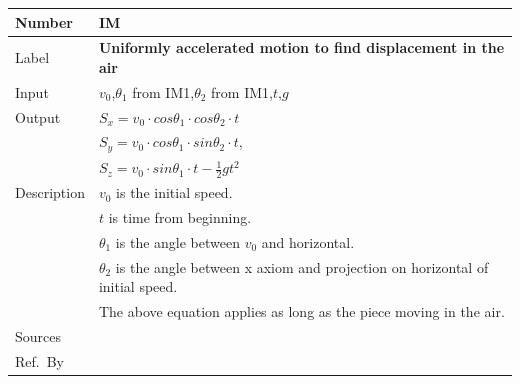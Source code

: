 \documentclass[12pt]{article}
\newcommand{\colAwidth}{0.13\textwidth}
\newcommand{\colBwidth}{0.82\textwidth}
\newcounter{instnum} %
\begin{document}
	\noindent
	\begin{minipage}{\textwidth}
		\renewcommand*{\arraystretch}{1.5}
		\begin{tabular}{| p{\colAwidth} | p{\colBwidth}|}
			\hline
			\rowcolor[gray]{0.9}
			Number& IM{instnum}\theinstnum \label{IM_DIA}\\
			\hline
			Label& \bf Uniformly accelerated motion to find displacement in the air\\
			\hline
			Input&$v_{0}$,$\theta_{1}$ from IM1,$\theta_{2}$ from IM1,$t$,$g$\\
			\hline
			Output&$S_{x}=v_{0}\cdot cos\theta _{1}\cdot cos\theta _{2}\cdot t$\\
			&$S_{y}=v_{0}\cdot cos\theta _{1}\cdot sin\theta _{2}\cdot t$,\\
			&$S_{z}=v_{0}\cdot sin\theta _{1}\cdot t-\frac{1}{2}gt^{2}$\\
			\hline
			Description&$v_{0}$ is the initial speed.\\
			&$t$ is time from beginning.\\
			&$\theta _{1}$ is the angle between $v_{0}$ and horizontal.\\
			&$\theta _{2}$ is the angle between x axiom and projection on horizontal of initial speed.\\
			& The above equation applies as long as the piece moving in the air.
			\\
			\hline
			Sources&~\ \ \\
			\hline
			Ref.\ By & \\
			\hline
		\end{tabular}
	\end{minipage}\\
	
	~\newline
	
\end{document}
